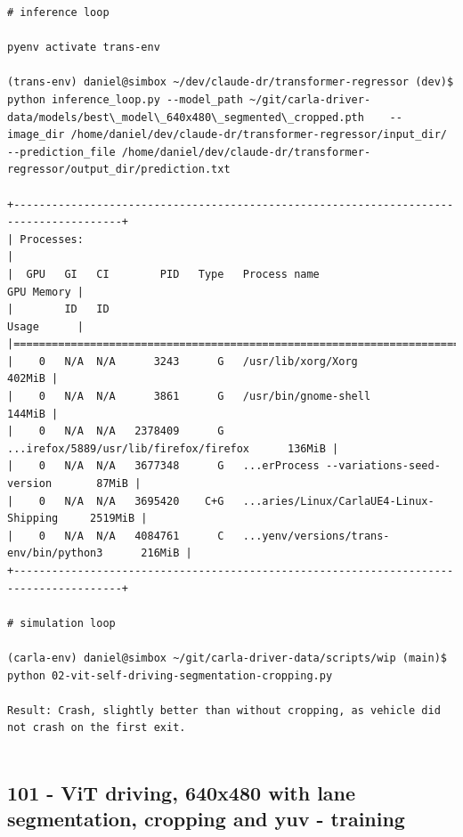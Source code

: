 \begin{verbatim}
# inference loop

pyenv activate trans-env

(trans-env) daniel@simbox ~/dev/claude-dr/transformer-regressor (dev)$ python inference_loop.py --model_path ~/git/carla-driver-data/models/best\_model\_640x480\_segmented\_cropped.pth    --image_dir /home/daniel/dev/claude-dr/transformer-regressor/input_dir/     --prediction_file /home/daniel/dev/claude-dr/transformer-regressor/output_dir/prediction.txt

+---------------------------------------------------------------------------------------+
| Processes:                                                                            |
|  GPU   GI   CI        PID   Type   Process name                            GPU Memory |
|        ID   ID                                                             Usage      |
|=======================================================================================|
|    0   N/A  N/A      3243      G   /usr/lib/xorg/Xorg                          402MiB |
|    0   N/A  N/A      3861      G   /usr/bin/gnome-shell                        144MiB |
|    0   N/A  N/A   2378409      G   ...irefox/5889/usr/lib/firefox/firefox      136MiB |
|    0   N/A  N/A   3677348      G   ...erProcess --variations-seed-version       87MiB |
|    0   N/A  N/A   3695420    C+G   ...aries/Linux/CarlaUE4-Linux-Shipping     2519MiB |
|    0   N/A  N/A   4084761      C   ...yenv/versions/trans-env/bin/python3      216MiB |
+---------------------------------------------------------------------------------------+

# simulation loop

(carla-env) daniel@simbox ~/git/carla-driver-data/scripts/wip (main)$ python 02-vit-self-driving-segmentation-cropping.py

Result: Crash, slightly better than without cropping, as vehicle did not crash on the first exit.


\end{verbatim}

\subsection{101 - ViT driving, 640x480 with lane segmentation, cropping and yuv - training}
\label{app_res:101}

